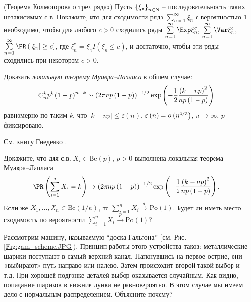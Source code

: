 \begin{problem}\Star(Теорема Колмогорова о трех рядах) 
Пусть $\left\{ {\xi _n } 
\right\}_{n\in {\rm N}} $ -- последовательность таких независимых с.в. 
Покажите, что для сходимости ряда $\sum\limits_{n=1}^\infty {\xi _n } $ с 
вероятностью 1 необходимо, чтобы для любого $c>0$ сходились ряды 
$\sum\limits_{n=1}^\infty {\Exp\xi _n^c } $, $\sum\limits_{n=1}^\infty {\Var\xi 
_n^c } $, $\sum\limits_{n=1}^\infty {\PR\left( {\left| {\xi _n } \right|\ge c} 
\right)} $, где $\xi _n^c =\xi _n I\left( {\xi _n \le c} \right)$, и 
достаточно, чтобы эти ряды сходились при некотором $c>0$.
\end{problem}



\begin{problem} Доказать \textit{локальную теорему Муавра--Лапласа} в общем случае:
\[
C_n^k p^k\left( {1-p} \right)^{n-k}\sim \left( {2\pi np\left( {1-p} \right)} 
\right)^{-1 \mathord{\left/ {\vphantom {1 2}} \right. 
\kern-\nulldelimiterspace} 2}\exp \left( {-\frac{1}{2}\frac{\left( {k-np} 
\right)^2}{np\left( {1-p} \right)}} \right)
\]
равномерно по таким $k$, что $\left| {k-np} \right|\le \varepsilon \left( n 
\right)$, $\varepsilon \left( n \right)=o\left( {n^{2 \mathord{\left/ 
{\vphantom {2 3}} \right. \kern-\nulldelimiterspace} 3}} \right)$, $n\to 
\infty $, $p$ -- фиксировано.
\end{problem}

\begin{ordre}
См. книгу Гнеденко \cite{2}. 
\end{ordre}

\begin{problem}
Докажите, что для с.в. $X_i \in \text{Be}(p)$, $p > 0$ выполнена локальная теорема Муавра--Лапласа
\[
\PR\left(\sum_{i = 1}^n X_i = k \right) \to 
\left( {2\pi np\left( {1-p} \right)} 
\right)^{-1 \mathord{\left/ {\vphantom {1 2}} \right. 
\kern-\nulldelimiterspace} 2}\exp \left( {-\frac{1}{2}\frac{\left( {k-np} 
\right)^2}{np\left( {1-p} \right)}} \right).
\]
Если же $X_1,\ldots,X_n \in \text{Be}(1/n)$, то $\sum_{i = 1}^n X_i \mathop{\longrightarrow}\limits^{d} \text{Po}(1)$. Будет ли иметь место сходимость по вероятности  $\sum_{i = 1}^n X_i \mathop{\longrightarrow}\limits^{p} \text{Po}(1)$?

\end{problem}

\begin{problem}
Рассмотрим машину, называемую ``доска Гальтона'' (см. Рис.\ref{Fig:gam_scheme.JPG}).
Принцип работы этого устройства таков: металлические шарики поступают в самый верхний канал. Наткнувшись на первое острие, они «выбирают» путь направо или налево. Затем происходит второй такой выбор и т.д. При хорошей подгонке деталей выбор оказывается случайным. Как видно, попадание шариков в нижние лунки не равновероятно. В этом случае мы имеем дело с нормальным распределением. Объясните почему?
\end{problem}

